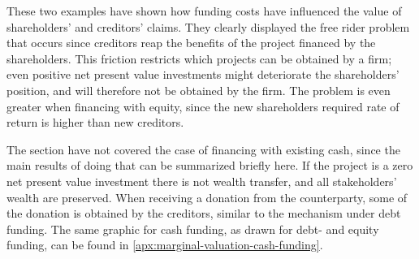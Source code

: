 \documentclass[main.tex]{subfiles}
\begin{document}
    These two examples have shown how funding costs have influenced 
    the value of shareholders' and creditors' claims.
    They clearly displayed the free rider problem that occurs
    since creditors reap the benefits of the project financed by the shareholders.
    This friction restricts which projects can be obtained by a firm;
    even positive net present value investments might deteriorate the shareholders' position,
    and will therefore not be obtained by the firm.
    The problem is even greater when financing with equity, 
    since the new shareholders required rate of return is higher than new creditors.
    
    The section have not covered the case of financing with existing cash,
    since the main results of doing that can be summarized briefly here.
    If the project is a zero net present value investment there is not wealth transfer,
    and all stakeholders' wealth are preserved.
    When receiving a donation from the counterparty, 
    some of the donation is obtained by the creditors, similar to the mechanism under debt funding.
    The same graphic for cash funding, as drawn for debt- and equity funding, can be found in 
    \cref{apx:marginal-valuation-cash-funding}.
\end{document}
